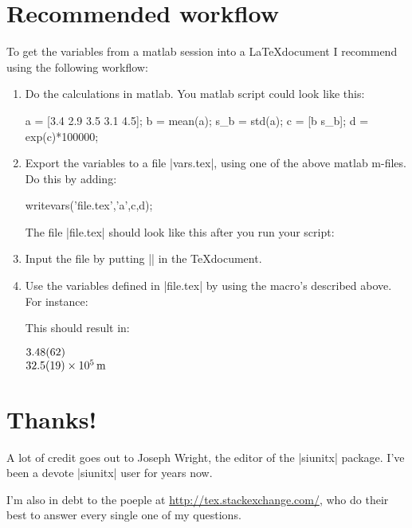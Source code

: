 \documentclass[a4paper,10pt]{article}
\begin{document}
\section{Recommended workflow}
To get the variables from a matlab session into a \LaTeX document I recommend using the following workflow:
\begin{enumerate}
	\item Do the calculations in matlab. You matlab script could look like this:
\begin{center}
	\begin{matlabcode}
		a = [3.4 2.9 3.5 3.1 4.5];
		b = mean(a);
		s_b = std(a);
		c = [b s_b];
		d = exp(c)*100000;
	\end{matlabcode}
\end{center}
	\item Export the variables to a file |vars.tex|, using one of the above matlab m-files. Do this by adding:
\begin{center}
\begin{matlabcode}
	writevars('file.tex','a',c,d);
	\end{matlabcode}
\end{center}
The file |file.tex| should look like this after you run your script:
\begin{center}
\begin{texcode}
\end{texcode}
\end{center}
	\item Input the file by putting || in the \TeX document.
	\item Use the variables defined in |file.tex| by using the macro's described above. For instance:
\begin{center}
\begin{texcode}
		
\end{texcode}
\end{center}

This should result in:

	\begin{minipage}[t]{\textwidth}
	$\SI{3.48+-0.62}{}$\\
	$\SI{32.5+-1.9e5}{\metre}$
	\end{minipage}
\end{enumerate}


\section{Thanks!}
A lot of credit goes out to Joseph Wright, the editor of the |siunitx| package. I've been a devote |siunitx| user for years now. 

I'm also in debt to the poeple at \url{http://tex.stackexchange.com/}, who do their best to answer every single one of my questions. 


\printindex
\end{document}
